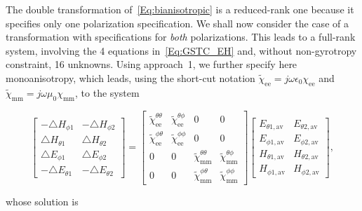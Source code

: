 \documentclass[journal,transaction]{IEEEtran}
\begin{document}
The double transformation of~\eqref{Eq:bianisotropic} is a reduced-rank one because it specifies only one polarization specification. We shall now consider the case of a transformation with specifications for \emph{both} polarizations. This leads to a full-rank system, involving the 4 equations in~\eqref{Eq:GSTC_EH} and, without non-gyrotropy constraint, 16 unknowns. Using approach~1, we further specify here monoanisotropy, which leads, using the short-cut notation $\tilde{\chi}_\text{ee}=j\omega\epsilon_0\chi_\text{ee}$ and $\tilde{\chi}_\text{mm}=j\omega\mu_0\chi_\text{mm}$, to the system
%
\begin{small}
\begin{equation}\label{Eq:doublematrix}
\begin{bmatrix}
-\triangle H_{\phi1}&  -\triangle H_{\phi2} \\
\triangle H_{\theta1}&  \triangle H_{\theta2} \\
\triangle E_{\phi1}&  \triangle E_{\phi2} \\
-\triangle E_{\theta1}&  -\triangle E_{\theta2}
  \end{bmatrix}= \begin{bmatrix}
 \tilde{ \chi}^{\theta\theta}_\text{ee}&\tilde{\chi}^{\theta\phi}_\text{ee}&0&0\\
 \tilde{ \chi}^{\phi \theta}_\text{ee}&\tilde{\chi}^{\phi \phi}_\text{ee}&0&0\\
  0&0&\tilde{\chi}^{\theta\theta}_\text{mm}&\tilde{\chi}^{\theta\phi}_\text{mm}\\
    0&0&\tilde{\chi}^{\phi \theta}_\text{mm}&\tilde{\chi}^{\phi \phi}_\text{mm}
  \end{bmatrix}
\begin{bmatrix}
 E_{\theta1,\text{av}}&   E_{\theta2,\text{av}} \\
 E_{\phi1,\text{av}}&   E_{\phi2,\text{av}} \\
H_{\theta1,\text{av}}&   H_{\theta2,\text{av}} \\
H_{\phi1,\text{av}}&  H_{\phi2,\text{av}}
  \end{bmatrix},
\end{equation}
\end{small}
%
whose solution is
%
\end{document}
